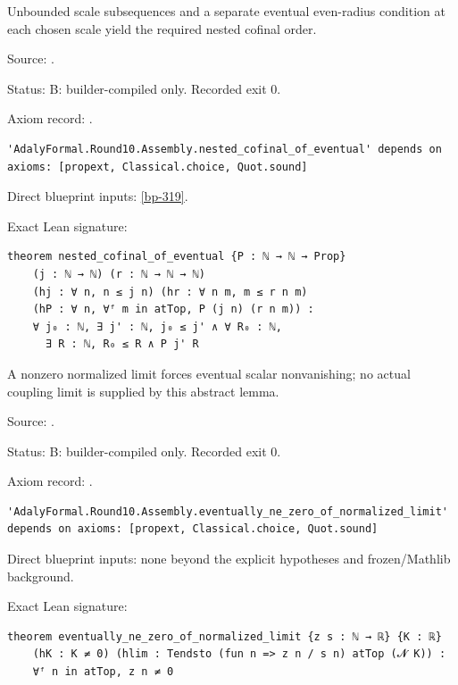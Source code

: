 \begin{theorem}[bp-132]
\label{bp-132}
\leanok
Unbounded scale subsequences and a separate eventual even-radius condition at each chosen scale yield the required nested cofinal order.

\par Source: \texttt{}.
\par Status: B: builder-compiled only. Recorded exit 0.
\par Axiom record: \texttt{}.
\begin{verbatim}
'AdalyFormal.Round10.Assembly.nested_cofinal_of_eventual' depends on axioms: [propext, Classical.choice, Quot.sound]
\end{verbatim}
\par Direct blueprint inputs: \ref{bp-319}.
\par Exact Lean signature:
\begin{verbatim}
theorem nested_cofinal_of_eventual {P : ℕ → ℕ → Prop}
    (j : ℕ → ℕ) (r : ℕ → ℕ → ℕ)
    (hj : ∀ n, n ≤ j n) (hr : ∀ n m, m ≤ r n m)
    (hP : ∀ n, ∀ᶠ m in atTop, P (j n) (r n m)) :
    ∀ j₀ : ℕ, ∃ j' : ℕ, j₀ ≤ j' ∧ ∀ R₀ : ℕ,
      ∃ R : ℕ, R₀ ≤ R ∧ P j' R
\end{verbatim}
\end{theorem}

\begin{theorem}[bp-133]
\label{bp-133}
\uses{}
\leanok
A nonzero normalized limit forces eventual scalar nonvanishing; no actual coupling limit is supplied by this abstract lemma.

\par Source: \texttt{}.
\par Status: B: builder-compiled only. Recorded exit 0.
\par Axiom record: \texttt{}.
\begin{verbatim}
'AdalyFormal.Round10.Assembly.eventually_ne_zero_of_normalized_limit' depends on axioms: [propext, Classical.choice, Quot.sound]
\end{verbatim}
\par Direct blueprint inputs: none beyond the explicit hypotheses and frozen/Mathlib background.
\par Exact Lean signature:
\begin{verbatim}
theorem eventually_ne_zero_of_normalized_limit {z s : ℕ → ℝ} {K : ℝ}
    (hK : K ≠ 0) (hlim : Tendsto (fun n => z n / s n) atTop (𝓝 K)) :
    ∀ᶠ n in atTop, z n ≠ 0
\end{verbatim}
\end{theorem}

